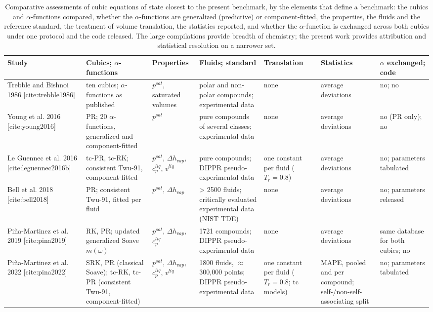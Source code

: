 \begin{table}[H]
\centering
\caption{Comparative assessments of cubic equations of state closest to the present benchmark, by the elements that define a benchmark: the cubics and $\alpha$-functions compared, whether the $\alpha$-functions are generalized (predictive) or component-fitted, the properties, the fluids and the reference standard, the treatment of volume translation, the statistics reported, and whether the $\alpha$-function is exchanged across both cubics under one protocol and the code released. The large compilations provide breadth of chemistry; the present work provides attribution and statistical resolution on a narrower set.}
\label{tab:tab_compare}
\small
\begin{tabular}{p{2.3cm}p{2.9cm}p{2.0cm}p{2.6cm}p{2.0cm}p{2.3cm}p{2.1cm}}
\toprule
Study & Cubics; $\alpha$-functions & Properties & Fluids; standard & Translation & Statistics & $\alpha$ exchanged; code \\
\midrule
Trebble and Bishnoi 1986 [cite:trebble1986] & ten cubics; $\alpha$-functions as published & $p^{sat}$, saturated volumes & polar and non-polar compounds; experimental data & none & average deviations & no; no \\
Young et al. 2016 [cite:young2016] & PR; 20 $\alpha$-functions, generalized and component-fitted & $p^{sat}$ & pure compounds of several classes; experimental data & none & average deviations & no (PR only); no \\
Le Guennec et al. 2016 [cite:leguennec2016b] & tc-PR, tc-RK; consistent Twu-91, component-fitted & $p^{sat}$, $\Delta h_{vap}$, $c_p^{liq}$, $v^{liq}$ & pure compounds; DIPPR pseudo-experimental data & one constant per fluid ($T_r = 0.8$) & average deviations & no; parameters tabulated \\
Bell et al. 2018 [cite:bell2018] & PR; consistent Twu-91, fitted per fluid & $p^{sat}$, $\Delta h_{vap}$ & > 2500 fluids; critically evaluated experimental data (NIST TDE) & none & average deviations & no; parameters released \\
Pi\~na-Martinez et al. 2019 [cite:pina2019] & RK, PR; updated generalized Soave $m(\omega)$ & $p^{sat}$, $\Delta h_{vap}$, $c_p^{liq}$ & 1721 compounds; DIPPR pseudo-experimental data & none & average deviations & same database for both cubics; no \\
Pi\~na-Martinez et al. 2022 [cite:pina2022] & SRK, PR (classical Soave); tc-RK, tc-PR (consistent Twu-91, component-fitted) & $p^{sat}$, $\Delta h_{vap}$, $c_p^{liq}$, $v^{liq}$ & 1800 fluids, $\approx$300,000 points; DIPPR pseudo-experimental data & one constant per fluid ($T_r = 0.8$; tc models) & MAPE, pooled and per compound; self-/non-self-associating split & no; parameters tabulated \\

\end{tabular}
\end{table}
